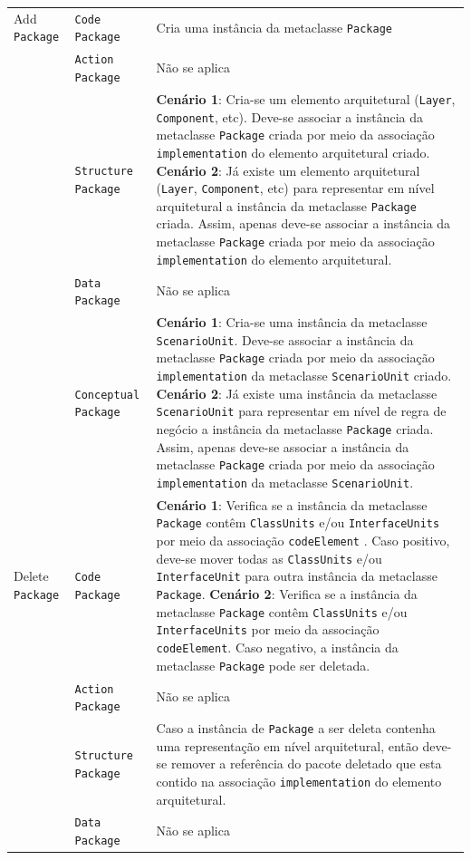 \begin{longtable}{ | m{1.9cm} | m{3.57cm}| m{9.3cm} | }
 Add \texttt{Package} & \texttt{Code Package} & Cria uma instância da metaclasse \texttt{Package}\tabularnewline
\cline{2-3} 
\cline{2-3} 
 & \texttt{Action Package} & Não se aplica \tabularnewline
 \cline{2-3} 
 & \texttt{Structure Package} & \textbf{Cenário 1}: Cria-se um elemento arquitetural (\texttt{Layer}, \texttt{Component}, etc). Deve-se associar a instância da metaclasse \texttt{Package} criada por meio da associação  \texttt{implementation} do elemento arquitetural criado. \textbf{Cenário 2}: Já existe um elemento arquitetural (\texttt{Layer}, \texttt{Component}, etc) para representar em nível arquitetural a instância da metaclasse \texttt{Package} criada. Assim, apenas deve-se associar a instância da metaclasse \texttt{Package} criada por meio da associação \texttt{implementation} do elemento arquitetural. \tabularnewline
\cline{2-3} 
 & \texttt{Data Package} & Não se aplica \tabularnewline
\cline{2-3} 
 & \texttt{Conceptual Package} & \textbf{Cenário 1}: Cria-se uma instância da metaclasse \texttt{ScenarioUnit}. Deve-se associar a instância da metaclasse \texttt{Package} criada por meio da associação \texttt{implementation} da metaclasse \texttt{ScenarioUnit} criado. \textbf{Cenário 2}: Já existe uma instância da metaclasse \texttt{ScenarioUnit} para representar em nível de regra de negócio a instância da metaclasse \texttt{Package} criada. Assim, apenas deve-se associar a instância da metaclasse \texttt{Package} criada por meio da associação \texttt{implementation} da metaclasse \texttt{ScenarioUnit}. \tabularnewline
\hline 
 Delete \texttt{Package} & \texttt{Code Package} & \textbf{Cenário 1}: Verifica se a instância da metaclasse \texttt{Package} contêm \texttt{ClassUnits} e/ou \texttt{InterfaceUnits}  por meio da associação \texttt{codeElement} . Caso positivo, deve-se mover todas as \texttt{ClassUnits} e/ou \texttt{InterfaceUnit} para outra instância da metaclasse \texttt{Package}. \textbf{Cenário 2}: Verifica se a instância da metaclasse \texttt{Package} contêm \texttt{ClassUnits} e/ou \texttt{InterfaceUnits}  por meio da associação \texttt{codeElement}. Caso negativo, a instância da metaclasse \texttt{Package} pode ser deletada.\tabularnewline
\cline{2-3} 
& \texttt{Action Package} & Não se aplica \tabularnewline
\cline{2-3}
& \texttt{Structure Package} & Caso a instância de \texttt{Package} a ser deleta contenha uma representação em nível arquitetural, então deve-se remover a referência do pacote deletado que esta contido na associação \texttt{implementation} do elemento arquitetural. \tabularnewline
\cline{2-3}
& \texttt{Data Package} & Não se aplica \tabularnewline

\end{longtable}
